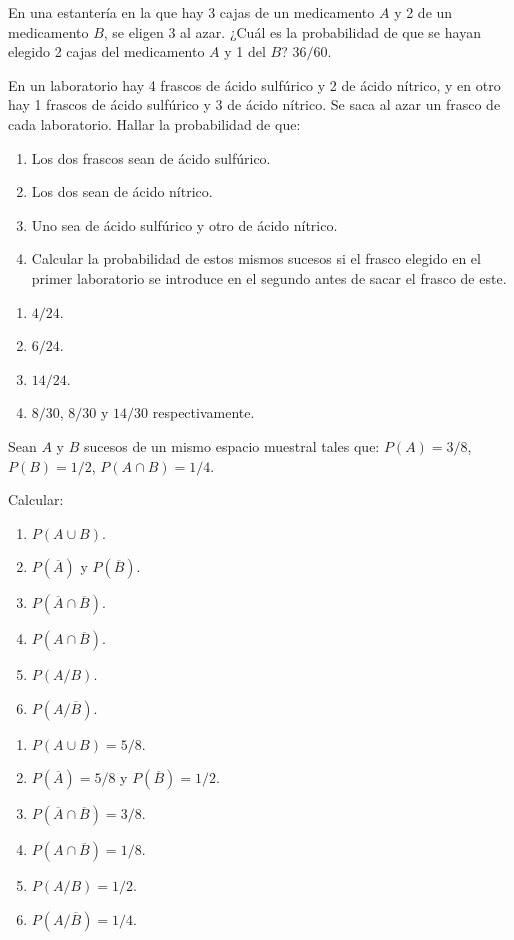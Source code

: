 
{En una estantería en la que hay 3 cajas de un medicamento $A$ y 2 de un medicamento $B$, se eligen 3 al azar.
¿Cuál es la probabilidad de que se hayan elegido 2 cajas del medicamento $A$ y 1 del $B$?
}
{$36/60$.}
{}


{En un laboratorio hay 4 frascos de ácido sulfúrico y 2 de ácido nítrico, y en otro hay 1 frascos de ácido sulfúrico y
3 de ácido nítrico.
Se saca al azar un frasco de cada laboratorio. Hallar la probabilidad de que:

\begin{enumerate}
\item  Los dos frascos sean de ácido sulfúrico.
\item  Los dos sean de ácido nítrico.
\item  Uno sea de ácido sulfúrico y otro de ácido nítrico.
\item Calcular la probabilidad de estos mismos sucesos si el frasco elegido en el primer laboratorio se introduce en el
segundo antes de sacar el frasco de este. 
\end{enumerate}
}
{
\begin{enumerate}
\item $4/24$.
\item $6/24$.
\item $14/24$.
\item $8/30$, $8/30$ y $14/30$ respectivamente. 
\end{enumerate}
}
{}


{Sean $A$ y $B$ sucesos de un mismo espacio muestral tales que: $P(A)=3/8$, $P(B)=1/2$, $P(A\cap B)=1/4$.

Calcular:
\begin{enumerate}
\item  $P(A\cup B)$.
\item  $P(\overline{A})$ y $P(\overline{B})$.
\item  $P(\overline{A}\cap \overline{B})$.
\item  $P(A\cap \overline{B})$.
\item  $P(A/B)$.
\item  $P(A/\overline{B})$.
\end{enumerate}
}
{
\begin{enumerate}
\item  $P(A\cup B)=5/8$.
\item  $P(\overline{A})=5/8$ y $P(\overline{B})=1/2$.
\item  $P(\overline{A}\cap \overline{B})=3/8$.
\item  $P(A\cap \overline{B})=1/8$.
\item  $P(A/B)=1/2$.
\item  $P(A/\overline{B})=1/4$.
\end{enumerate}
}
{}


